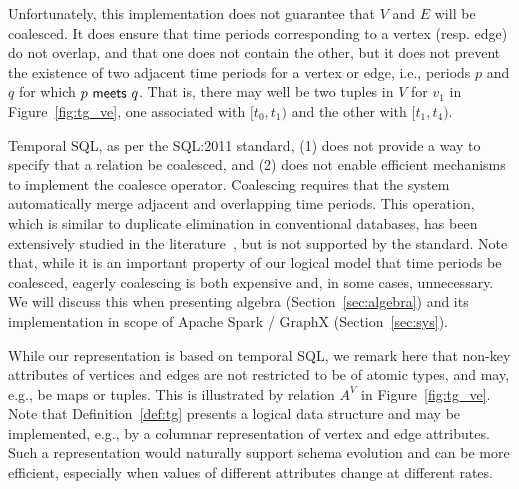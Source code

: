 Unfortunately, this implementation does not guarantee that $V$ and $E$
will be coalesced.  It does ensure that time periods corresponding to
a vertex (resp. edge) do not overlap, and that one does not contain
the other, but it does not prevent the existence of two adjacent time
periods for a vertex or edge, i.e., periods $p$ and $q$ for which
$p~\mathsf{meets}~q$.  That is, there may well be two tuples in $V$
for $v_1$ in Figure~\ref{fig:tg_ve}, one associated with $[t_0,t_1)$
  and the other with $[t_1,t_4)$.

Temporal SQL, as per the SQL:2011 standard, (1) does not provide a way
to specify that a relation be coalesced, and (2) does not enable
efficient mechanisms to implement the coalesce operator.  Coalescing
requires that the system automatically merge adjacent and overlapping
time periods.  This operation, which is similar to duplicate
elimination in conventional databases, has been extensively studied in
the
literature~\cite{DBLP:conf/vldb/BohlenSS96,DBLP:journals/sigmod/Zimanyi06},
but is not supported by the standard.  Note that, while it is an
important property of our logical model that time periods be
coalesced, eagerly coalescing is both expensive and, in some cases,
unnecessary.  We will discuss this when presenting \tg algebra
(Section~\ref{sec:algebra}) and its implementation in scope of Apache
Spark / GraphX (Section~\ref{sec:sys}).


While our \ve representation is based on temporal SQL, we remark here
that non-key attributes of vertices and edges are not restricted to be
of atomic types, and may, e.g., be maps or tuples. This is illustrated
by relation $A^V$ in Figure~\ref{fig:tg_ve}.  Note that
Definition~\ref{def:tg} presents a logical data structure and may be
implemented, e.g., by a columnar representation of vertex and edge
attributes.  Such a representation would naturally support schema
evolution and can be more efficient, especially when values of
different attributes change at different rates.


